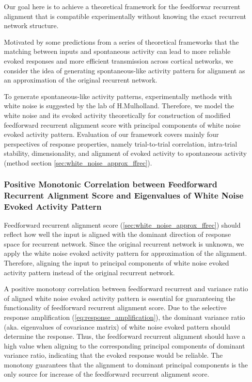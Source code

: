 \documentclass[11pt]{article}
\begin{document}
	Our goal here is to achieve a theoretical framework for the feedforwar recurrent alignment that is compatible experimentally without knowing the exact recurrent network structure. 
	
	Motivated by some predictions from a series of theoretical frameworks \cite{mulholland2023selective, marre2009reliable} that the matching between inputs and spontaneous activity can lead to more reliable evoked responses and more efficient transmission across cortical networks, we consider the idea of generating spontaneous-like activity pattern for alignment as an approximation of the original recurrent network. 
	
	To generate spontaneous-like activity patterns, experimentally methods with white noise is suggested by the lab of H.Mulholland.  %
	Therefore, we model the white noise and its evoked activity theoretically for construction of modified feedforward recurrent alignment score with principal components of white noise evoked activity pattern. Evaluation of our framework covers mainly four perspectives of response properties, namely trial-to-trial correlation, intra-trial stability, dimensionality, and alignment of evoked activity to spontaneous activity (method section \ref{sec:white_noise_approx_ffrec}). 
	
	\subsubsection{Positive Monotonic Correlation between Feedforward Recurrent Alignment Score and Eigenvalues of White Noise Evoked Activity Pattern}
	
	Feedforward recurrent alignment score (\ref{sec:white_noise_approx_ffrec}) should reflect how well the input is aligned with the dominant direction of response space for recurrent network. Since the original recurrent network is unknown, we apply the white noise evoked activity pattern for approximation of the alignment. Therefore, aligning the input to principal components of white noise evoked activity pattern instead of the original recurrent network. 
	
	A positive monotony correlation between feedforward recurrent and variance ratio of aligned white noise evoked activity pattern is essential for guaranteeing the functionality of feedforward recurrent alignment score. Due to the selective response amplification (\ref{eq:response_amplification}), the dominant variance ratio (aka. eigenvalues of covariance matrix) of white noise evoked pattern should determine the response. Thus, the feedforward recurrent alignment should have a high value when aligning to the corresponding principal components of dominant variance ratio, indicating that the evoked response would be reliable. The monotony guarantees that the alignment to dominant principal components is the only source for increase of the feedforward recurrent alignment score. 
	
\end{document}
